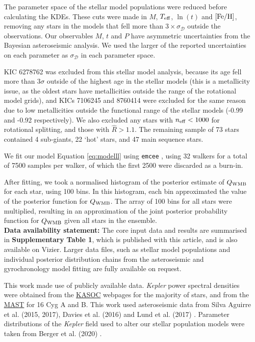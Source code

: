 \documentclass[12pt]{article}
\newcommand{\teff}{\mbox{$T_{\rm eff}$}\xspace}
\newcommand{\feh}{\mbox{$\rm{[Fe/H]}$}\xspace}
\newcommand{\kepler}{\emph{Kepler}\xspace}
\begin{document}
The parameter space of the stellar model populations were reduced before calculating the KDEs. These cuts were made in $M$, $\teff$, $\ln(t)$ and \feh, removing any stars in the models that fell more than $3 \times \sigma_{\mathcal{D}}$ outside the observations. Our observables $M$, $t$ and $P$ have asymmetric uncertainties from the Bayesian asteroseismic analysis. We used the larger of the reported uncertainties on each parameter as $\sigma_{\mathcal{D}}$ in each parameter space. 

KIC 6278762 was excluded from this stellar model analysis, because its age fell more than $3\sigma$ outside of the highest age in the stellar models (this is a metallicity issue, as the oldest stars have metallicities outside the range of the rotational model grids), and KICs 7106245 and 8760414 were excluded for the same reason due to low metallicities outside the functional range of the stellar models (-0.99 and -0.92 respectively). We also excluded any stars with $n_{\rm eff} < 1000$ for rotational splitting, and those with $\hat{R} > 1.1$. The remaining sample of 73 stars contained 4 sub-giants, 22 `hot' stars, and 47 main sequence stars.

We fit our model Equation \ref{eq:modelll} using \texttt{emcee} \cite{foreman-mackey+2013, foreman-mackey2016}, using 32 walkers for a total of 7500 samples per walker, of which the first 2500 were discarded as a burn-in.

After fitting, we took a normalised histogram of the posterior estimate of $Q_{\rm WMB}$ for each star, using 100 bins. In this histogram, each bin approximated the value of the posterior function for $Q_{\rm WMB}$. The array of 100 bins for all stars were multiplied, resulting in an approximation of the joint posterior probability function for $Q_{\rm WMB}$ given all stars in the ensemble.\\

\textbf{Data availability statement:} The core input data and results are summarised in  \textbf{Supplementary Table 1}, which is published with this article, and is also available on Vizier. Larger data files, such as stellar model populations and individual posterior distribution chains from the asteroseismic and gyrochronology model fitting are fully available on request.

This work made use of publicly available data. \kepler power spectral densities were obtained from the \href{http://kasoc.phys.au.dk/}{KASOC} webpages for the majority of stars, and from the \href{https://archive.
	stsci.edu/prepds/kepseismic/}{MAST} for 16 Cyg A and B. This work used asteroseismic data from Silva Aguirre et al. (2015, 2017), Davies et al. (2016) and Lund et al. (2017) \cite{silvaaguirre+2015, silvaaguirre+2017, davies+2016, lund+2017}. Parameter distributions of the \kepler field used to alter our stellar population models were taken from Berger et al. (2020) \cite{berger+2020}.\\
\end{document}
